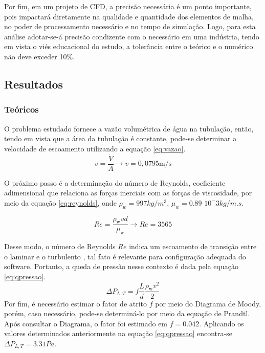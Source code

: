 \documentclass[12pt]{article}
\begin{document}
Por fim, em um projeto de CFD, a precisão necessária é um ponto importante, pois impactará diretamente na qualidade e quantidade dos elementos de malha, no poder de processamento necessário e no tempo de simulação. Logo, para esta análise adotar-se-á precisão condizente com o necessário em uma indústria, tendo em vista o viés educacional do estudo, a tolerância entre o teórico e o numérico não deve exceder 10\%.

\subsection{Resultados}
\label{resultados}
\subsubsection{Teóricos}
O problema estudado fornece a vazão volumétrica de água na tubulação, então, tendo em vista que a área da tubulação é constante, pode-se determinar a velocidade de escoamento utilizando a equação \ref{eq:vazao}.
\begin{equation}
v=\frac{\dot{V}}{A} \rightarrow v=0,0795 \mathrm{m} / \mathrm{s}
\label{eq:vazao}
\end{equation}

O próximo passo é a determinação do número de Reynolds, coeficiente adimensional que relaciona as forças inerciais com as forças de viscosidade, por meio da equação \ref{eq:reynolds}, onde $\rho_{w} = 997 kg/m^3$, $\mu_{w} = 0.89$ $10^-3 kg/m.s$.

\begin{equation}
R e = \frac{\rho_{\text {w}} v d}{\mu_{\text {w}}} \rightarrow R e=3565
\label{eq:reynolds}
\end{equation}

Desse modo, o número de Reynolds $Re$ indica um escoamento de transição entre o laminar e o turbulento \cite{cengel}, tal fato é relevante para configuração adequada do software. Portanto, a queda de pressão nesse contexto é dada pela equação \ref{eq:qpressao}.
\begin{equation}
\Delta P_{L, T} = f \frac{L}{d} \frac{\rho_{\text {w}} v^{2}}{2}
\label{eq:qpressao}
\end{equation}
Por fim, é necessário estimar o fator de atrito $f$ por meio do Diagrama de Moody, porém, caso necessário, pode-se determiná-lo por meio da equação de Prandtl. Após consultar o Diagrama, o fator foi estimado em $f = 0.042$. Aplicando os valores determinados anteriormente na equação \ref{eq:qpressao} encontra-se $\Delta P_{L,T} = 3.31 Pa$.
\end{document}
